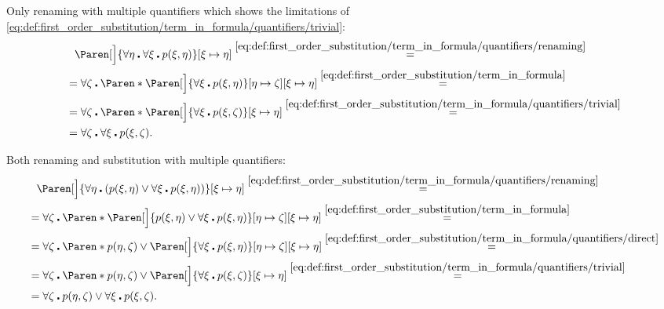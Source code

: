 \begin{example}
\begin{ExEnum}
     Only renaming with multiple quantifiers which shows the limitations of \eqref{eq:def:first_order_substitution/term_in_formula/quantifiers/trivial}:
    \begin{align*}
      &{}\phantom{=}{}
      \Paren[\Big]{\forall \eta \centerdot \forall \xi \centerdot p(\xi, \eta)}[\xi \mapsto \eta]
      \overset {\eqref{eq:def:first_order_substitution/term_in_formula/quantifiers/renaming}} = \\ &=
      \forall \zeta \centerdot \Paren*{ \Paren[\Big]{ \forall \xi \centerdot p(\xi, \eta) }[\eta \mapsto \zeta][\xi \mapsto \eta]}
      \overset {\eqref{eq:def:first_order_substitution/term_in_formula}} = \\ &=
      \forall \zeta \centerdot \Paren*{ \Paren[\Big]{ \forall \xi \centerdot p(\xi, \zeta) }[\xi \mapsto \eta]}
      \overset {\eqref{eq:def:first_order_substitution/term_in_formula/quantifiers/trivial}} = \\ &=
      \forall \zeta \centerdot \forall \xi \centerdot p(\xi, \zeta).
    \end{align*}

     Both renaming and substitution with multiple quantifiers:
    \begin{align*}
      &{}\phantom{=}{}
      \Paren[\Big]{ \forall \eta \centerdot (p(\xi, \eta) \vee \forall \xi \centerdot p(\xi, \eta)) }[\xi \mapsto \eta]
      \overset {\eqref{eq:def:first_order_substitution/term_in_formula/quantifiers/renaming}} = \\ &=
      \forall \zeta \centerdot \Paren*{ \Paren[\Big]{ p(\xi, \eta) \vee \forall \xi \centerdot p(\xi, \eta) }[\eta \mapsto \zeta][\xi \mapsto \eta] }
      \overset {\eqref{eq:def:first_order_substitution/term_in_formula}} = \\ &=
      \forall \zeta \centerdot \Paren*{ p(\eta, \zeta) \vee \Paren[\Big]{ \forall \xi \centerdot p(\xi, \eta) }[\eta \mapsto \zeta][\xi \mapsto \eta] }
      \overset {\eqref{eq:def:first_order_substitution/term_in_formula/quantifiers/direct}} = \\ &=
      \forall \zeta \centerdot \Paren*{ p(\eta, \zeta) \vee \Paren[\Big]{ \forall \xi \centerdot p(\xi, \zeta) }[\xi \mapsto \eta] }
      \overset {\eqref{eq:def:first_order_substitution/term_in_formula/quantifiers/trivial}} = \\ &=
      \forall \zeta \centerdot p(\eta, \zeta) \vee \forall \xi \centerdot p(\xi, \zeta).
    \end{align*}


\end{ExEnum}
\end{example}
